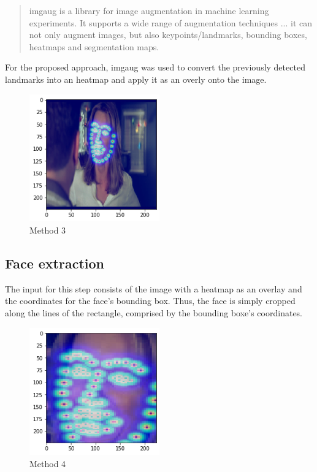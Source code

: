 \begin{quote}
    imgaug is a library for image augmentation in machine learning experiments. It supports a wide range of augmentation techniques ... it can not only augment images, but also keypoints/landmarks, bounding boxes, heatmaps and segmentation maps. \citep{Jung:2020:Imgaug}
\end{quote}
For the proposed approach, imgaug was used to convert the previously detected landmarks into an heatmap and apply it as an overly onto the image.

\begin{center}
\begin{figure}[H]
  \begin{center}
  \includegraphics[angle=0, width=0.5\textwidth]{Figures/method_3.png}
  \caption{Method 3}
  \label{fig:MachineLearningModelMethod_3}
  \end{center}
\end{figure}
\end{center}

\subsection{Face extraction}
The input for this step consists of the image with a heatmap as an overlay and the coordinates for the face's bounding box. Thus, the face is simply cropped along the lines of the rectangle, comprised by the bounding boxe's coordinates. %

\begin{center}
\begin{figure}[H]
  \begin{center}
  \includegraphics[angle=0, width=0.5\textwidth]{Figures/method_4.png}
  \caption{Method 4}
  \label{fig:MachineLearningModelMethod_4}
  \end{center}
\end{figure}
\end{center}

